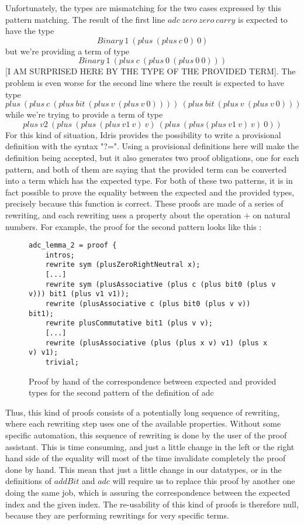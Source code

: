 Unfortunately, the types are mismatching for the two cases expressed by this pattern matching. The result of the first line $adc\ zero\ zero\ carry$ is expected to have the type\[Binary\ 1\ (plus\ (plus\ c\ 0)\ 0)\] but we're providing a term of type \[Binary\ 1\ (plus\ c\ (plus\ 0\ (plus\ 0\ 0)))\] [I AM SURPRISED HERE BY THE TYPE OF THE PROVIDED TERM].
The problem is even worse for the second line where the result is expected to have type \[plus\ (plus\ c\ (plus\ bit\ (plus\ v\ (plus\ v\ 0))))\ (plus\ bit\ (plus\ v\ (plus\ v\ 0)))\] while we're trying to provide a term of type \[plus\ v2\ (plus\ (plus\ (plus\ v1\ v)\ v)\ (plus\ (plus (plus\ v1\ v)\ v)\ 0))\]
For this kind of situation, Idris provides the possibility to write a provisional definition with the syntax "?=". Using a provisional definitions here will make the definition being accepted, but it also generates two proof obligations, one for each pattern, and both of them are saying that the provided term can be converted into a term which has the expected type.
For both of these two patterns, it is in fact possible to prove the equality between the expected and the provided types, precisely because this function is correct. These proofs are made of a series of rewriting, and each rewriting uses a property about the operation $+$ on natural numbers.
For example, the proof for the second pattern looks like this :
\begin{figure}[H]
\figrule
\begin{center}
\begin{lstlisting}
adc_lemma_2 = proof {
    intros;
    rewrite sym (plusZeroRightNeutral x);
    [...]
    rewrite sym (plusAssociative (plus c (plus bit0 (plus v v))) bit1 (plus v1 v1));
    rewrite (plusAssociative c (plus bit0 (plus v v)) bit1);
    rewrite plusCommutative bit1 (plus v v);
    [...]
    rewrite (plusAssociative (plus (plus x v) v1) (plus x v) v1);
    trivial;
\end{lstlisting}
\end{center}
\caption{Proof by hand of the correspondence between expected and provided types for the second pattern of the definition of adc}
\figrule
\end{figure}


Thus, this kind of proofs consists of a potentially long sequence of rewriting, where each rewriting step uses one of the available properties. Without some specific automation, this sequence of rewriting is done by the user of the proof assistant. This is time consuming, and just a little change in the left or the right hand side of the equality will most of the time invalidate completely the proof done by hand. This mean that just a little change in our datatypes, or in the definitions of $addBit$ and $adc$ will require us to replace this proof by another one doing the same job, which is assuring the correspondence between the expected index and the given index. The re-usability of this kind of proofs is therefore null, because they are performing rewritings for very specific terms.

